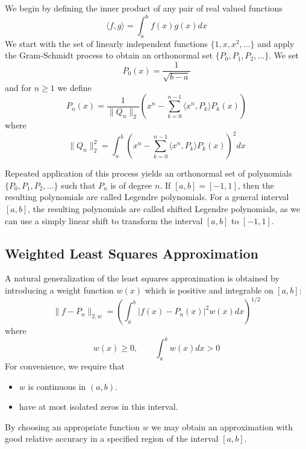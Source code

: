 \documentclass[../main.tex]{subfiles}
\begin{document}
We begin by defining the inner product of any pair of real valued functions
\begin{equation}
	\langle f, g \rangle = \int_a^b f(x) g(x) dx
\end{equation}
We start with the set of linearly independent functions $\{1, x, x^2, \dots\}$ and apply the Gram-Schmidt process to obtain an orthonormal set $\{P_0, P_1, P_2, \dots\}$. We set
\begin{equation}
	P_0(x) = \frac{1}{\sqrt{b-a}}
\end{equation}
and for $n \geq 1$ we define
\begin{equation}
	P_n(x) = \frac{1}{\| Q_n \|_2} \left( x^n - \sum_{k=0}^{n-1} \langle x^n, P_k \rangle P_k(x) \right)
\end{equation}
where
\begin{equation}
	\| Q_n \|_2^2 = \int_a^b \left( x^n - \sum_{k=0}^{n-1} \langle x^n, P_k \rangle P_k(x) \right)^2 dx
\end{equation}

Repeated application of this process yields an orthonormal set of polynomials $\{P_0, P_1, P_2, \dots\}$ such that $P_n$ is of degree $n$. If $[a,b] = [-1,1]$, then the resulting polynomials are called Legendre polynomials. For a general interval $[a,b]$, the resulting polynomials are called shifted Legendre polynomials, as we can use a simply linear shift to transform the interval $[a,b]$ to $[-1,1]$.

\subsection{Weighted Least Squares Approximation}
A natural generalization of the least squares approximation is obtained by introducing a weight function $w(x)$ which is positive and integrable on $[a,b]$:
\begin{equation}
	\| f - P_n \|_{2,w} = \left( \int_a^b |f(x) - P_n(x)|^2 w(x) dx \right)^{1/2}
\end{equation}
where
\begin{equation}
	w(x) \geq 0, \qquad \int_a^b w(x) dx > 0
\end{equation}
For convenience, we require that
\begin{itemize}
	\item $w$ is continuous in $(a,b)$.
	\item have at most isolated zeros in this interval.
\end{itemize}
By choosing an appropriate function $w$ we may obtain an approximation with good relative accuracy in a specified region of the interval $[a,b]$.
\end{document}

